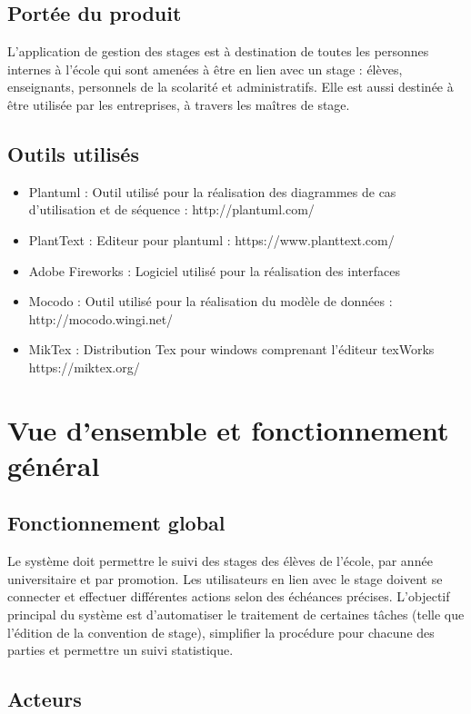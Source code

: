 \documentclass{scrreprt}
\begin{document}
\section{ Portée du produit}
L’application de gestion des stages est à destination de toutes les personnes internes à l’école qui sont amenées à être en lien avec un stage : élèves, enseignants, personnels de la scolarité et administratifs.
Elle est aussi destinée à être utilisée par les entreprises, à travers les maîtres de stage.


\section{Outils utilisés}
\begin{itemize}
\item Plantuml : Outil utilisé pour la réalisation des diagrammes de cas d'utilisation et de séquence : http://plantuml.com/ 
\item PlantText : Editeur pour plantuml : https://www.planttext.com/
\item Adobe Fireworks : Logiciel utilisé pour la réalisation des interfaces
\item Mocodo :  Outil utilisé pour la réalisation du modèle de données : http://mocodo.wingi.net/
\item MikTex : Distribution Tex pour windows comprenant l’éditeur texWorks https://miktex.org/
\end{itemize}

\chapter{Vue d'ensemble et fonctionnement g\'en\'eral}

\section{Fonctionnement global}
Le système doit permettre le suivi des stages des élèves de l’école, par année universitaire et par promotion. Les utilisateurs en lien avec le stage doivent se connecter et effectuer différentes actions selon des échéances précises. L’objectif principal du système est d’automatiser le traitement de certaines tâches (telle que l’édition de la convention de stage), simplifier la procédure pour chacune des parties et permettre un suivi statistique.

\section{Acteurs}
\end{document}
